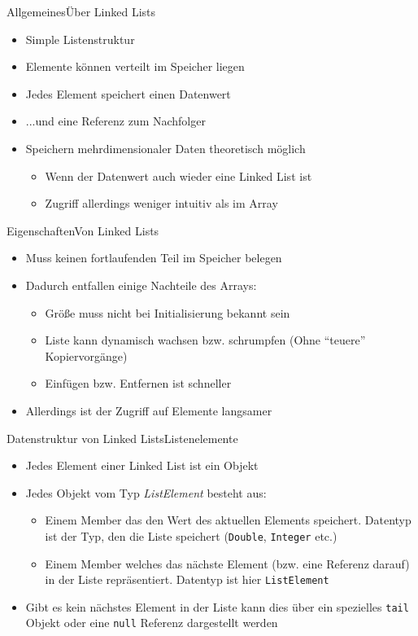 \begin{frame}{Allgemeines}{Über Linked Lists}
	\begin{itemize}
		\item Simple Listenstruktur
		\item Elemente können verteilt im Speicher liegen
		\item Jedes Element speichert einen Datenwert
		\item ...und eine Referenz zum Nachfolger
		\item Speichern mehrdimensionaler Daten theoretisch möglich
		\begin{itemize}
			\item Wenn der Datenwert auch wieder eine Linked List ist
			\item Zugriff allerdings weniger intuitiv als im Array
		\end{itemize}
	\end{itemize}
\end{frame}


\begin{frame}{Eigenschaften}{Von Linked Lists}
	\begin{itemize}
		\item Muss keinen fortlaufenden Teil im Speicher belegen
		\item Dadurch entfallen einige Nachteile des Arrays:
		\begin{itemize}
			\item Größe muss nicht bei Initialisierung bekannt sein
			\item Liste kann dynamisch wachsen bzw. schrumpfen (Ohne "`teuere"' Kopiervorgänge)
			\item Einfügen bzw. Entfernen ist schneller
		\end{itemize}
		\item Allerdings ist der Zugriff auf Elemente langsamer
	\end{itemize}
\end{frame}

\begin{frame}{Datenstruktur von Linked Lists}{Listenelemente}
	\begin{itemize}
		\item Jedes Element einer Linked List ist ein Objekt
		\item Jedes Objekt vom Typ \textit{ListElement} besteht aus:
		\begin{itemize}
			\item Einem Member das den Wert des aktuellen Elements speichert. Datentyp ist der Typ, den die Liste speichert (\texttt{Double}, \texttt{Integer} etc.)
			\item Einem Member welches das nächste Element (bzw. eine Referenz darauf) in der Liste repräsentiert. Datentyp ist hier \texttt{ListElement}
		\end{itemize}
		\item Gibt es kein nächstes Element in der Liste kann dies über ein spezielles \texttt{tail} Objekt oder eine \texttt{null} Referenz dargestellt werden
	\end{itemize}
\end{frame}

